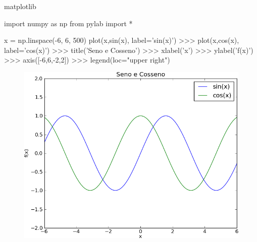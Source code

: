 \documentclass[12pt,t,graphics]{beamer}
\begin{document}
\begin{frame}[t,fragile]{matplotlib}
		\begin{python}
		import numpy as np
		from pylab import *
		
		x = np.linspace(-6, 6, 500)
		plot(x,sin(x), label='sin(x)')
		>>> plot(x,cos(x), label='cos(x)')
		>>> title('Seno e Cosseno')
		>>> xlabel('x')
		>>> ylabel('f(x)')
		>>> axis([-6,6,-2,2])
		>>> legend(loc="upper right")
		\end{python}
		\begin{figure}
			\centering
			\includegraphics[scale=0.25]{img/plot4.png}
		\end{figure}	
\end{frame}
\end{document}
